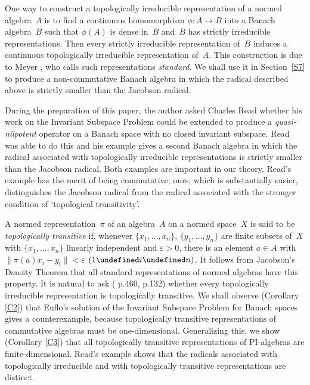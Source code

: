 \documentclass[11pt]{article}
\let\leq\undefined  \let\geq\undefined
\let\le\leq   \let\ge\geq
\newcommand{\e}{\varepsilon}
\begin{document}
One way to construct a topologically irreducible representation of a normed
algebra~$A$ is to find a continuous homomorphism $\phi:A\to B$ into a Banach
algebra~$B$ such that $\phi(A)$ is dense in~$B$ and~$B$ has strictly irreducible
representations.    Then every strictly irreducible representation of~$B$
induces a continuous topologically irreducible representation of~$A$.  This
construction is due to Meyer \cite{Meyer1}, who calls such representations {\em
standard}.     We shall use it in Section~\ref{S7} to produce a non-commutative
Banach algebra in which the radical described above is strictly smaller than the
Jacobson radical.

During the preparation of this paper, the author asked Charles Read whether his
work on the Invariant Subspace Problem could be extended to produce a {\it
quasi-nilpotent} operator on a Banach space with no closed invariant subspace.
Read was able to do this \cite{Readqn} and his example gives a second Banach
algebra in which the radical associated with topologically irreducible
representations is strictly smaller than the Jacobson radical.  Both examples
are important in our theory.   Read's example has the merit of being commutative;
ours, which is substantially easier, distinguishes the Jacobson radical from the
radical associated with the stronger condition of `topological transitivity'.

A normed representation~$\pi$ of an algebra~$A$ on a normed space~$X$ is said to
be {\em topologically transitive} if, whenever $\{x_1,\dots,x_n\}$,
$\{y_1,\dots,y_n\}$ are finite subsets of~$X$ with $\{x_1,\dots,x_n\}$ linearly
independent and $\e>0$, there is an element $a \in A$ with $\|\pi(a)x_i - y_i\|
< \e$ $(1 \le i \le n)$.  It follows from Jacobson's Density Theorem that all
standard representations of normed algebras have this property.    It is natural
to ask (\cite{Palmerbk} p.460, \cite{BD} p.132) whether every topologically
irreducible representation is topologically transitive.   We shall observe
(Corollary \ref{C2}) that Enflo's solution of the Invariant Subspace Problem for
Banach spaces gives a counterexample, because topologically transitive
representations of commutative algebras must be one-dimensional.  Generalizing
this, we show (Corollary \ref{C3}) that all topologically transitive
representations of PI-algebras are finite-dimensional.   Read's example shows
that the radicals associated with topologically irreducible and with
topologically transitive representations are distinct.
\end{document}

